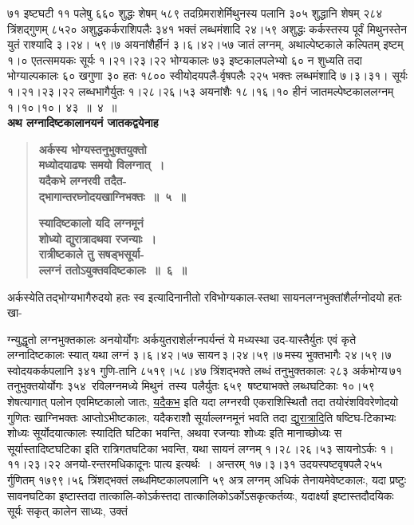 \documentclass[11pt, openany]{book}
\begin{document}
\newpage

\noindent ७१ इष्टघटी ११ पलेषु ६६० शुद्धः शेषम् ५८९ तदग्रिमराशेर्मिथुनस्य पलानि ३०५ शुद्धानि शेषम् २८४ त्रिंशद्गुणम् ८५२० अशुद्धकर्कराशिपलैः ३४१ भक्तं लब्धमंशादि २४।५९ अशुद्धः कर्कस्तस्य पूर्वं मिथुनस्तेन युतं राश्यादि ३।२४। ५९।७ \;अयनांशैर्हीनं \;३।६।४२।५७ \;जातं \;लग्नम्, \;अथाल्पेष्टकाले \;कल्पितम् इष्टम् १।० एतत्समयकः सूर्यः १।२१।२३।२२ भोग्यकालः ७३ इष्टकालपलेभ्यो ६० न शुध्यति तदा भोग्याल्पकालः ६० खगुणा ३० हतः १८०० स्वीयोदयपलै-र्वृषपलैः २२५ भक्तः लब्धमंशादि ७।३।३१। सूर्यः १।२१।२३।२२ लब्धभागैर्युतः १।२८।२६।५३ अयनांशैः १८।१६।१० हीनं जातमल्पेष्टकाललग्नम् १।१०।१०। ४३~॥~४~॥\\

{\small \textbf{अथ लग्नादिष्टकालानयनं जातकद्वयेनाह\textendash }}

 \label{3.5}
\begin{quote}
{\large \textbf{{\color{purple}अर्कस्य भोग्यस्तनुभुक्तयुक्तो \\
मध्योदयाढ्यः समयो विलग्नात्~। \\
यदैकभे लग्नरवी तदैत-\\
द्भागान्तरघ्नोदयखाग्निभक्तः~॥~५~॥}} 
\vspace{1mm}

 \label{3.6}
\textbf{{\color{purple}स्यादिष्टकालो यदि लग्नमूनं\\
शोध्यो द्युरात्रादथवा रजन्याः~। \\
रात्रीष्टकाले तु सषड्भसूर्या-\\
ल्लग्नं ततोऽयुक्तवदिष्टकालः~॥~६~॥}}}
\end{quote}

अर्कस्येति\textendash \,तद्भोग्यभागैरुदयो हतः स्व इत्यादिनानीतो रविभोग्यकाल-स्तथा सायनलग्नभुक्तांशैर्लग्नोदयो हतः खा-

\newpage

\noindent ग्न्युद्धृतो लग्नभुक्तकालः अनयोर्योगः अर्कयुतराशेर्लग्नपर्यन्तं ये मध्यस्था उद-यास्तैर्युतः एवं कृते लग्नादिष्टकालः स्यात् यथा लग्नं ३।६।४२।५७ सायन\textendash \,३।२४।५९।७\textendash \,मस्य \;भुक्तभागैः \;२४।५९।७ \;स्वोदयकर्कपलानि \;३४१ \;गुणि-तानि ८५१९।५८।४७ त्रिंशद्भक्ते लब्धं तनुभुक्तकालः २८३ अर्कभोग्य\textendash \,७१\textendash \,तनुभुक्तयोर्योगः \;३५४ \,रविलग्नमध्ये \;मिथुनं \,तस्य \,पलैर्युतः \;६५९ \,षष्ट्याभक्ते लब्धघटिकाः १०।५९ शेषत्यागात् पलोन एवमिष्टकालो जातः, \hyperref[3.5]{यदैकभ} इति यदा लग्नरवी एकराशिस्थितौ तदा तयोरंशविवरेणोदयो गुणितः खाग्निभक्तः आप्तोऽभीष्टकालः, यदैकराशौ सूर्याल्लग्नमूनं भवति तदा \hyperref[3.6]{द्युरात्रादि}ति षष्टिघ-टिकाभ्यः शोध्यः सूर्योदयात्कालः स्यादिति घटिका भवन्ति, अथवा रजन्याः शोध्यः \;इति \;मानाच्छोध्यः \;स \;सूर्यास्तादिष्टघटिका \;इति \;रात्रिगतघटिका भवन्ति, यथा सायनं लग्नम् १।२८।२६।५३ सायनोऽर्कः १।११।२३।२२ अनयो-रन्तरमधिकादूनः \;पात्य \;इत्यर्थः~। अन्तरम् \;१७।३।३१ \;उदयस्पष्टवृषपलै\textendash \,२५५\textendash \,र्गुणितम् १७९९।५६ त्रिंशद्भक्तं लब्धमिष्टकालपलानि ५९ अत्र लग्नम् अधिकं \;तेनायमेवेष्टकालः, \;यदा \;प्रष्टुः \;सावनघटिका \;इष्टास्तदा \;तात्कालि-कोऽर्कस्तदा तात्कालिकोऽर्कोऽसकृत्कर्तव्यः, यदार्क्ष्या इष्टास्तदौदयिकः सूर्यः सकृत् कालेन साध्यः, उक्तं
\end{document}
